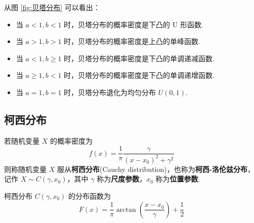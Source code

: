 从图 \ref{fig:贝塔分布} 可以看出：
\begin{itemize}
    \item 当 $a<1, b<1$ 时，贝塔分布的概率密度是下凸的 U 形函数.
    \item 当 $a>1, b>1$ 时，贝塔分布的概率密度是上凸的单峰函数.
    \item 当 $a<1, b \geqslant 1$ 时，贝塔分布的概率密度是下凸的单调递减函数.
    \item 当 $a \geqslant 1, b<1$ 时，贝塔分布的概率密度是下凸的单调递增函数.
    \item 当 $a=1, b=1$ 时，贝塔分布退化为均匀分布 $U(0,1)$.
\end{itemize}

\subsection{柯西分布}

\begin{definition}
    \indent 若随机变量 $X$ 的概率密度为
    \begin{equation}
        f(x) = \dfrac{1}{\pi} \dfrac{\gamma}{(x - x_0)^2 + \gamma^2}
    \end{equation}
    则称随机变量 $X$ 服从\textbf{柯西分布}(Cauchy distribution)，也称为\textbf{柯西-洛伦兹分布}，记作 $X \sim C(\gamma, x_0)$，其中 $\gamma$ 称为\textbf{尺度参数}，$x_0$ 称为\textbf{位置参数}.
\end{definition}

柯西分布 $C(\gamma, x_0)$ 的分布函数为
\begin{equation}
    F(x) = \dfrac{1}{\pi} \arctan \left( \dfrac{x - x_0}{\gamma} \right) + \dfrac{1}{2}
\end{equation}

